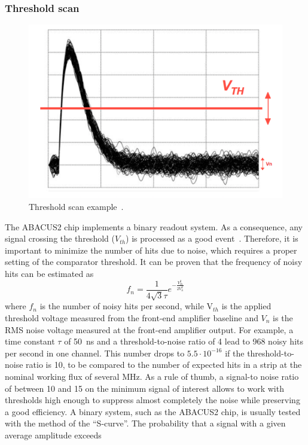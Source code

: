 \subsubsection{Threshold scan}\label{considerations}
\begin{figure}[H]
	\centering
	\includegraphics[width=0.7\linewidth]{IMG/ch5/DataDacConfig/tscan_sketch2}
	\caption{Threshold scan example~\cite{rivetti}.}
	\label{fig:tscansketch}
\end{figure}
\noindent The ABACUS2 chip implements a binary readout system. As a consequence, any signal crossing the threshold ($V_{th}$) is processed as a good event~\cite{rivetti}.
Therefore, it is important to minimize the number of hits due to noise, which requires a proper setting of the comparator threshold. It can be proven that the frequency of noisy hits can be estimated as
\begin{equation}
	f_n=\frac{1}{4 \sqrt{3} \tau} e^{- \frac{V^2_{th}}{2V^2_n}} 
\end{equation}
\noindent where $f_n$ is the number of noisy hits per second, while V$_{th}$ is the applied threshold voltage measured from the front-end amplifier baseline and $V_{n}$ is the RMS noise voltage measured at the front-end amplifier output.
For example, a time constant $\tau$ of 50~ns and a threshold-to-noise ratio of 4 lead to 968 noisy hits per second in one channel.
This number drops to $5.5\cdot10^{-16}$ if the threshold-to-noise ratio is 10, to be compared to the number of expected hits in a strip at the nominal working flux of several MHz.
As a rule of thumb, a signal-to noise ratio of between 10 and 15 on the minimum signal of interest allows to work with thresholds high enough to suppress almost completely the noise while preserving a good efficiency.
A binary system, such as the ABACUS2 chip, is usually tested with the method of the “S-curve”.
The probability that a signal with a given average amplitude exceeds
